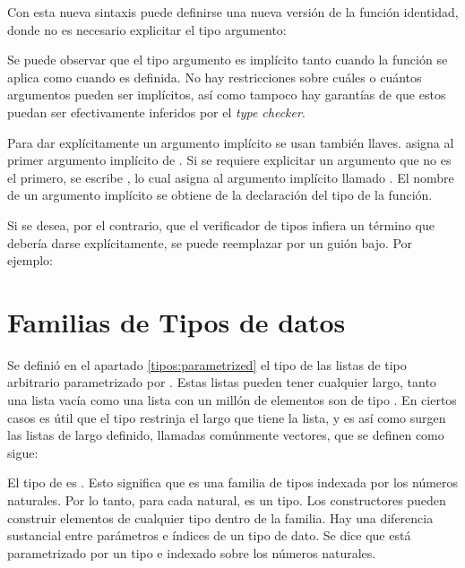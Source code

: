 Con esta nueva sintaxis puede definirse una nueva versión de la función identidad, donde no es necesario explicitar el tipo argumento:


Se puede observar que el tipo argumento es implícito tanto cuando la función se aplica como cuando es definida. No hay restricciones sobre cuáles o cuántos argumentos pueden ser implícitos, así como tampoco hay garantías de que estos puedan ser efectivamente inferidos por el \textit{type checker}. 

Para dar explícitamente un argumento implícito se usan también llaves.  \AgdaSymbol{\{}\AgdaSymbol{\}} asigna  al primer argumento implícito de . Si se requiere explicitar un argumento que no es el primero, se escribe  \AgdaSymbol{\{} \AgdaSymbol{=} \AgdaSymbol{\}}, lo cual asigna  al argumento implícito llamado . El nombre de un argumento implícito se obtiene de la declaración del tipo de la función. 

Si se desea, por el contrario, que el verificador de tipos infiera un término que debería darse explícitamente, se puede reemplazar por un guión bajo. Por ejemplo:


\section{Familias de Tipos de datos}\label{agda:family}

Se definió en el apartado \ref{tipos:parametrized} el tipo de las listas de tipo arbitrario parametrizado por . Estas listas pueden tener cualquier largo, tanto una lista vacía como una lista con un millón de elementos son de tipo  . En ciertos casos es útil que el tipo restrinja el largo que tiene la lista, y es así como surgen las listas de largo definido, llamadas comúnmente vectores, que se definen como sigue:


El tipo de   es  \AgdaSymbol{$\rightarrow$} . Esto significa que   es una familia de tipos indexada por los números naturales. Por lo tanto, para cada  natural,   es un tipo. Los constructores pueden construir elementos de cualquier tipo dentro de la familia. Hay una diferencia sustancial entre parámetros e índices de un tipo de dato. Se dice que  está parametrizado por un tipo  e indexado sobre los números naturales. 

